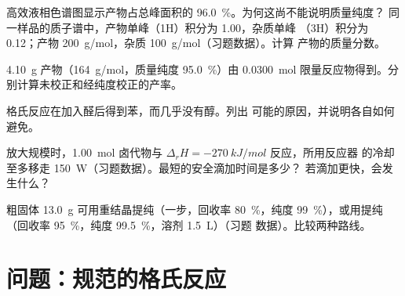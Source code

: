 \begin{exercise}[$\star\star$]\label{exo:b2:lab-techniques-2:8}
高效液相色谱图显示产物占总峰面积的 96.0~\%。为何这尚不能说明质量纯度？
同一样品的质子谱中，产物单峰（1H）积分为 1.00，杂质单峰
（3H）积分为 0.12；产物 \qty{200}{g/mol}，杂质 \qty{100}{g/mol}（习题数据）。计算
产物的质量分数。
\end{exercise}

\begin{exercise}[$\star\star$]\label{exo:b2:lab-techniques-2:9}
\qty{4.10}{g} 产物（\qty{164}{g/mol}，质量纯度 95.0~\%）由 \qty{0.0300}{mol}
限量反应物得到。分别计算未校正和经纯度校正的产率。
\end{exercise}

\begin{exercise}[$\star\star\star$]\label{exo:b2:lab-techniques-2:10}
格氏反应在加入醛后得到苯，而几乎没有醇。列出
可能的原因，并说明各自如何避免。
\end{exercise}

\begin{exercise}[$\star\star\star$]\label{exo:b2:lab-techniques-2:11}
放大规模时，\qty{1.00}{mol} 卤代物与 $\Delta_rH = \qty{-270}{kJ/mol}$ 反应，所用反应器
的冷却至多移走 \qty{150}{W}（习题数据）。最短的安全滴加时间是多少？
若滴加更快，会发生什么？
\end{exercise}

\begin{exercise}[$\star\star\star$]\label{exo:b2:lab-techniques-2:12}
粗固体 \qty{13.0}{g} 可用重结晶提纯（一步，回收率 80~\%，纯度
99~\%），或用提纯（回收率 95~\%，纯度 99.5~\%，溶剂 \qty{1.5}{L}）（习题
数据）。比较两种路线。
\end{exercise}

\section{问题：规范的格氏反应}

